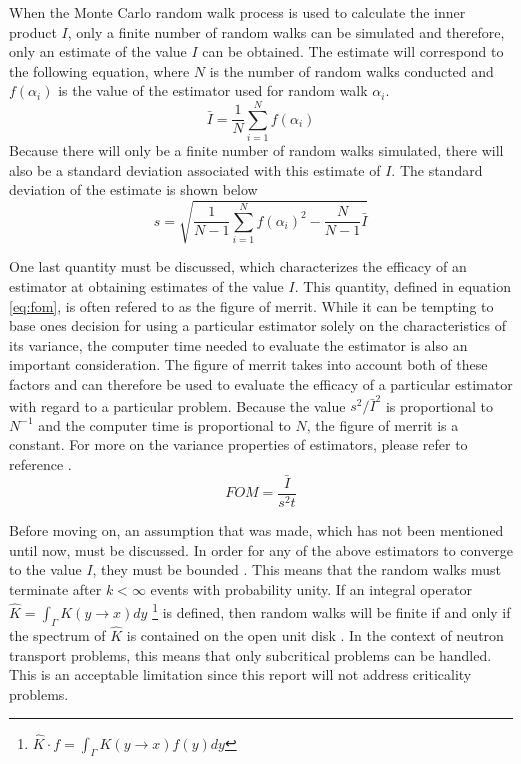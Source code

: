 When the Monte Carlo random walk process is used to calculate the inner product
$I$, only a finite number of random walks can be simulated and therefore, only 
an estimate of the value $I$ can be obtained. The estimate will
correspond to the following equation, where $N$ is the number of random walks
conducted and $f(\alpha_i)$ is the value of the estimator used for random
walk $\alpha_i$.
\begin{equation}
  \bar{I} = \frac{1}{N} \sum_{i=1}^N f(\alpha_i)
  \label{eq:inner_product_estimate}
\end{equation}
Because there will only be a finite number of random walks simulated, there
will also be a standard deviation associated with this estimate of $I$. The 
standard deviation of the estimate is shown below
\begin{equation}
  s = \sqrt{\frac{1}{N-1}\sum_{i=1}^N f(\alpha_i)^2 - \frac{N}{N-1}\bar{I}}
  \label{eq:inner_product_stddev}
\end{equation}

One last quantity must be discussed, which characterizes the efficacy of
an estimator at obtaining estimates of the value $I$. This quantity, defined
in equation \ref{eq:fom}, is often refered to as the figure of merrit. While it
can be tempting to base ones decision for using a particular estimator solely
on the characteristics of its variance, the computer time needed to evaluate 
the estimator is also an important consideration. The figure of merrit takes
 into account both of these factors and can therefore be used to evaluate the 
efficacy of a particular estimator with regard to a particular problem. 
Because the value $s^2/\bar{I}^2$ is proportional to $N^{-1}$ and the computer 
time is proportional to $N$, the figure of merrit is a constant. For more on
the variance properties of estimators, please refer to reference 
\cite{spanier_monte_1969}.
\begin{equation}
  FOM = \frac{\bar{I}}{s^2t}
  \label{eq:fom}
\end{equation}

Before moving on, an assumption that was made, which has not been mentioned
until now, must be discussed. In order for any of the above estimators to 
converge to the value $I$, they must be bounded \citep{spanier_monte_1969}. This
means that the random walks must terminate after $k < \infty$ events with 
probability unity. If an integral operator $\hat{K} = \int_{\Gamma} K(y \to x)dy$
\footnote{$\hat{K} \cdot f = \int_{\Gamma} K(y \to x)f(y)dy$} is defined, then 
random walks will be finite if and only if the spectrum of $\hat{K}$ is 
contained on the open unit disk \citep{spanier_monte_1969}. In the context of 
neutron transport problems, this means that only subcritical problems can be 
handled. This is an acceptable limitation since this report will not address 
criticality problems.

